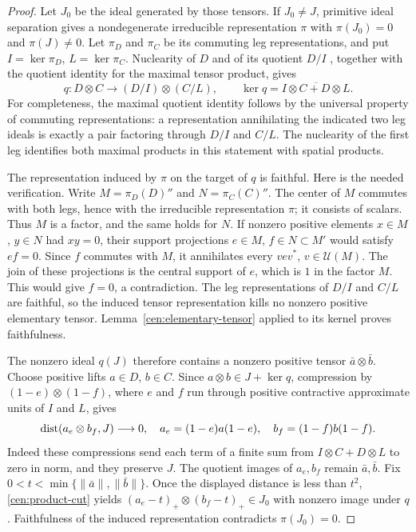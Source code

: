 \begin{proof}
Let $J_0$ be the ideal generated by those tensors.  If $J_0\ne J$,
primitive ideal separation gives a nondegenerate irreducible
representation $\pi$ with $\pi(J_0)=0$ and $\pi(J)\ne0$.
Let $\pi_D$ and $\pi_C$ be its commuting leg representations, and put
$I=\ker\pi_D$, $L=\ker\pi_C$.  Nuclearity of $D$ and of its quotient
$D/I$ \cite[Corollary~4]{CE1977}, together with the quotient identity for the maximal tensor
product, gives
\begin{equation}\label{cen:tensor-quotient}
 q:D\otimes C\longrightarrow (D/I)\otimes(C/L),\qquad
 \ker q=\overline{I\otimes C+D\otimes L}.
\end{equation}
For completeness, the maximal quotient identity follows by the
universal property of commuting representations: a representation
annihilating the indicated two leg ideals is exactly a pair factoring
through $D/I$ and $C/L$.  The nuclearity of the first leg identifies
both maximal products in this statement with spatial products.

The representation induced by $\pi$ on the target of $q$ is faithful.
Here is the needed verification.  Write
$M=\pi_D(D)''$ and $N=\pi_C(C)''$.  The center of $M$ commutes with
both legs, hence with the irreducible representation $\pi$; it consists
of scalars.  Thus $M$ is a factor, and the same holds for $N$.
If nonzero positive elements $x\in M$, $y\in N$ had $xy=0$, their
support projections $e\in M$, $f\in N\subset M'$ would satisfy
$ef=0$.  Since $f$ commutes with $M$, it annihilates every $vev^*$,
$v\in\mathcal U(M)$.  The join of these projections is the central
support of $e$, which is $1$ in the factor $M$.  This would give $f=0$,
a contradiction.  The leg representations of $D/I$ and $C/L$ are
faithful, so the induced tensor representation kills no nonzero positive
elementary tensor.  Lemma~\ref{cen:elementary-tensor} applied to its
kernel proves faithfulness.

The nonzero ideal $q(J)$ therefore contains a nonzero positive tensor
$\bar a\otimes\bar b$.  Choose positive lifts $a\in D$, $b\in C$.
Since $a\otimes b\in J+\ker q$, compression by
$(1-e)\otimes(1-f)$, where $e$ and $f$ run through positive contractive
approximate units of $I$ and $L$, gives
\[
 \operatorname{dist}(a_{e}\otimes b_f,J)\longrightarrow0,
 \quad a_e=(1-e)a(1-e),\quad b_f=(1-f)b(1-f).
\]
Indeed these compressions send each term of a finite sum from
$I\otimes C+D\otimes L$ to zero in norm, and they preserve $J$.
The quotient images of $a_e,b_f$ remain $\bar a,\bar b$.  Fix
$0<t<\min\{\|\bar a\|,\|\bar b\|\}$.  Once the displayed distance
is less than $t^2$, \eqref{cen:product-cut} yields
$(a_e-t)_+\otimes(b_f-t)_+\in J_0$ with nonzero image under $q$.
Faithfulness of the induced representation contradicts $\pi(J_0)=0$.
\end{proof}

